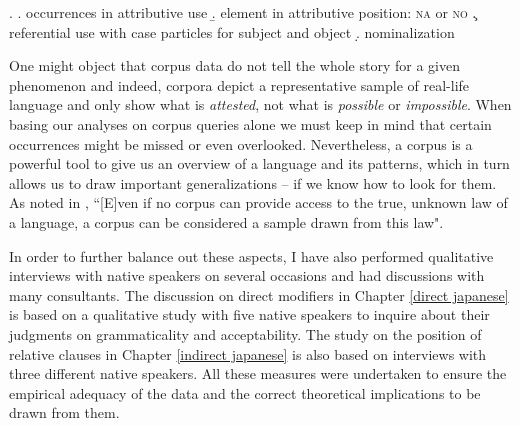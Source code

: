\ex. \a. occurrences in attributive use
\b. element in attributive position: \textsc{na} or \textsc{no}
\c. referential use with case particles for subject and object
\d. nominalization

One might object that corpus data do not tell the whole story for a given phenomenon and indeed, corpora depict a representative sample of real-life language and only show what is \textit{attested}, not what is \textit{possible} or \textit{impossible}. When basing our analyses on corpus queries alone we must keep in mind that certain occurrences might be missed or even overlooked. Nevertheless, a corpus is a powerful tool to give us an overview of a language and its patterns, which in turn allows us to draw important generalizations -- if we know how to look for them. As noted in \citet[7]{desagulier:2017:corpus}, ``[E]ven if no corpus can provide access to the true, unknown law of a language, a corpus can be considered a sample drawn from this law".

In order to further balance out these aspects, I have also performed qualitative interviews with native speakers on several occasions and had discussions with many consultants. The discussion on direct modifiers in Chapter \ref{direct japanese} is based on a qualitative study with five native speakers to inquire about their judgments on grammaticality and acceptability. The study on the position of relative clauses in Chapter \ref{indirect japanese} is also based on interviews with three different native speakers. All these measures were undertaken to ensure the empirical adequacy of the data and the correct theoretical implications to be drawn from them.

